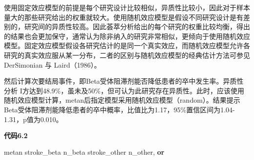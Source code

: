 \documentclass[
  chinese-hans,
  letterpaper,
  DIV=11,
  numbers=noendperiod]{scrreprt}
\newenvironment{Shaded}{\begin{snugshade}}{\end{snugshade}}
\newcommand{\KeywordTok}[1]{\textcolor[rgb]{0.00,0.23,0.31}{\textbf{#1}}}
\newcommand{\NormalTok}[1]{\textcolor[rgb]{0.00,0.23,0.31}{#1}}
\begin{document}
使用固定效应模型的前提是每个研究设计比较相似，异质性比较小，因此对于样本量大的那些研究给出的权重就较大。使用随机效应模型是假设不同研究设计是有差别的，研究间的异质性较高。因此荟萃分析给出的每个研究的权重比较均衡，得出的结果也会更加保守，通常认为除非纳入的研究非常相似，更倾向于使用随机效应模型。固定效应模型假设各研究估计的是同一个真实效应，而随机效应模型允许各研究的真实效应服从某一分布，二者的区别与随机效应模型的经典估计方法可参见
DerSimonian 与 Laird（1986）。

然后计算次要结局事件，即Beta受体阻滞剂能否降低患者的卒中发生率。异质性分析
I方达到48.9\%，虽未及50\%，但可认为此研究存在异质性。此时，应该使用随机效应模型计算，metan后指定模型采用随机效应模型（random）。结果提示Beta受体阻滞剂能降低患者的卒中概率，比值比为1.17，95\%置信区间为1.04-1.31，p值为0.010。

\begin{tcolorbox}[enhanced jigsaw, arc=.35mm, bottomrule=.15mm, breakable, colback=white, colframe=quarto-callout-note-color-frame, left=2mm, leftrule=.75mm, opacityback=0, rightrule=.15mm, toprule=.15mm]

\vspace{-3mm}\textbf{代码6.2}\vspace{3mm}

\begin{Shaded}
\begin{Highlighting}[]
\NormalTok{metan stroke\_beta n\_beta stroke\_other n\_other, }\KeywordTok{or}
\end{Highlighting}
\end{Shaded}

\end{tcolorbox}
\end{document}
